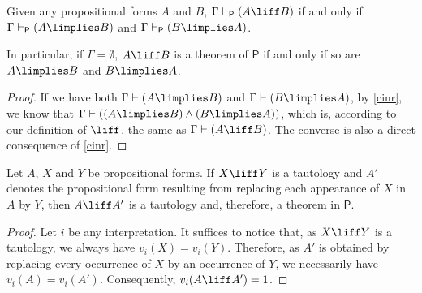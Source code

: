 \begin{proposition}
\label{piff}
Given any propositional forms $A$ and $B$, $\Gamma \vdash_{\mathsf{P}} (A \liff B)$ if and only if $\Gamma  \vdash_\mathsf{P} (A\limplies B)$ and $\Gamma \vdash_\mathsf{P} (B\limplies A)$.

In particular, if $\Gamma = \emptyset$, $A\liff B$ is a theorem of $\mathsf{P}$ if and only if so are $A\limplies B$ and $B\limplies A$.
\end{proposition}

\begin{proof}
If we have both $\Gamma\vdash (A\limplies B)$ and $\Gamma \vdash (B\limplies A)$, by \ref{cinr}, we know that $\Gamma \vdash ( (A\limplies B) \land (B\limplies A))$, which is, according to our definition of $\liff$, the same as $\Gamma \vdash (A\liff B)$.
The converse is also a direct consequence of \ref{cinr}.
\end{proof}


\begin{lemma}
Let $A$, $X$ and $Y$ be propositional forms. If $X\liff Y$ is a tautology and $A'$ denotes the propositional form resulting from replacing each appearance of $X$ in $A$ by $Y$, then $A\liff A'$ is a tautology and, therefore, a theorem in $\mathsf{P}$.
\label{replacetautology}
\end{lemma}

\begin{proof}
Let $i$ be any interpretation.
It suffices to notice that, as $X \liff Y$ is a tautology, we always have $v_i(X) = v_i(Y)$.
Therefore, as $A'$ is obtained by replacing every occurrence of $X$ by an occurrence of $Y$, we necessarily have $v_i(A) = v_i(A')$.
Consequently, $v_i(A\liff A') = 1$.
\end{proof}



